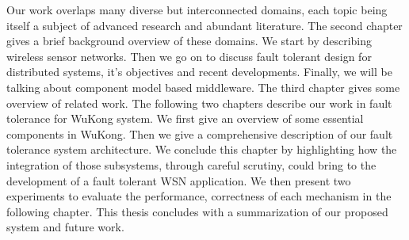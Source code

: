Our work overlaps many diverse but interconnected domains, each topic being 
itself a subject of advanced research and abundant literature. The second chapter
gives a brief background overview of these domains. We start by describing 
wireless sensor networks. Then we go on to discuss fault tolerant design for
distributed systems, it's objectives and recent developments. Finally, we will
be talking about component model based middleware. The third chapter gives some
overview of related work. The following two chapters describe our work in fault
tolerance for WuKong system. We first give an overview of some essential
components in WuKong. Then we give a comprehensive description of our fault
tolerance system architecture. We conclude this chapter by highlighting how the
integration of those subsystems, through careful scrutiny, could bring to the
development of a fault tolerant WSN application. We then present two
experiments to evaluate the performance, correctness of each mechanism in the
following chapter.
This thesis concludes with a summarization of our proposed system and future
work.
